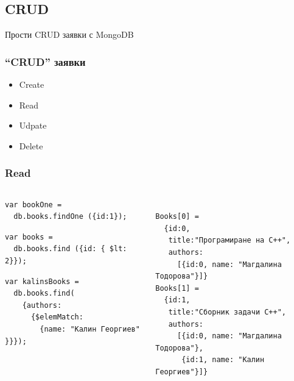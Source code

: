 \documentclass{beamer}
\begin{document}
\subsection{CRUD}

\begin{frame}
\centerline{Прости CRUD заявки с MongoDB}
\end{frame}



\begin{frame}[fragile]
\frametitle{``CRUD'' заявки}


\begin{itemize}
  \item Create
  \item Read
  \item Udpate
  \item Delete
\end{itemize}

\end{frame}


\begin{frame}[fragile]
\frametitle{Read}

\lstset{language=JavaScript}


\begin{columns}
  \begin{column}{0.55\textwidth}

\begin{lstlisting}
var bookOne =
  db.books.findOne ({id:1});
\end{lstlisting}


\begin{lstlisting}
var books =
  db.books.find ({id: { $lt: 2}});
\end{lstlisting}


\begin{lstlisting}
var kalinsBooks =
  db.books.find(
    {authors:
      {$elemMatch:
        {name: "Калин Георгиев" }}});
\end{lstlisting}

  \end{column}
  \begin{column}{0.45\textwidth}
\begin{lstlisting}

Books[0] =
  {id:0,
   title:"Програмиране на C++",
   authors:
     [{id:0, name: "Магдалина Тодорова"}]}
Books[1] =
  {id:1,
   title:"Сборник задачи C++",
   authors:
     [{id:0, name: "Магдалина Тодорова"},
      {id:1, name: "Калин Георгиев"}]}
\end{lstlisting}
  \end{column}
\end{columns}


\end{frame}
\end{document}
